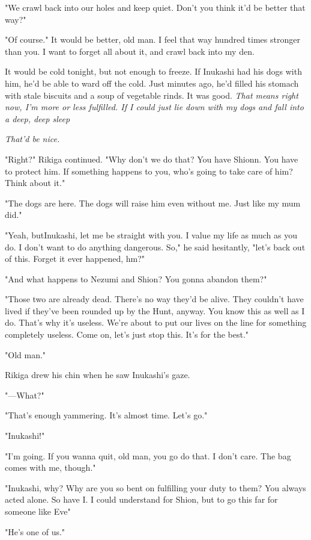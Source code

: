 "We crawl back into our holes and keep quiet. Don't you think it'd be\el 
better that way?"

"Of course." It would be better, old man. I feel that way hundred times
stronger than you. I want to forget all about it, and crawl back into my
den.

It would be cold tonight, but not enough to freeze. If Inukashi had his
dogs with him, he'd be able to ward off the cold. Just minutes ago, he'd
filled his stomach with stale biscuits and a soup of vegetable rinds. It
was good. \emph{That means right now, I'm more or less fulfilled. If I could
just lie down with my dogs and fall into a deep, deep sleep\el }

\emph{That'd be nice.}

"Right?" Rikiga continued. "Why don't we do that? You have Shionn. You
have to protect him. If something happens to you, who's going to take
care of him? Think about it."

"The dogs are here. The dogs will raise him even without me. Just like
my mum did."

"Yeah, but\el Inukashi, let me be straight with you. I value my life as
much as you do. I don't want to do anything dangerous. So," he said
hesitantly, "let's back out of this. Forget it ever happened, hm?"

"And what happens to Nezumi and Shion? You gonna abandon them?"

"Those two are already dead. There's no way they'd be alive. They
couldn't have lived if they've been rounded up by the Hunt, anyway. You
know this as well as I do. That's why it's useless. We're about to put
our lives on the line for something completely useless. Come on, let's
just stop this. It's for the best."

"Old man."

Rikiga drew his chin when he saw Inukashi's gaze.

"---What?"

"That's enough yammering. It's almost time. Let's go."

"Inukashi!"

"I'm going. If you wanna quit, old man, you go do that. I don't care.
The bag comes with me, though."

"Inukashi, why? Why are you so bent on fulfilling your duty to them? You
always acted alone. So have I. I could understand for Shion, but to go
this far for someone like Eve\el "

"He's one of us."

